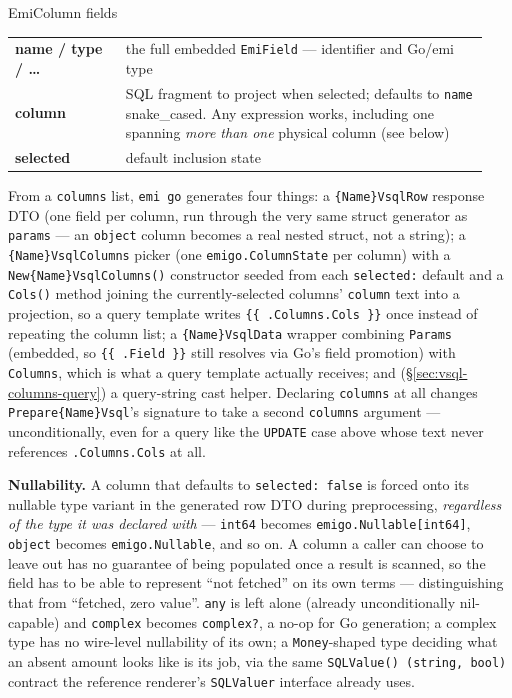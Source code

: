 \begin{sidebar}{EmiColumn fields}
\small
\begin{tabular}{@{}p{0.22\linewidth}p{0.72\linewidth}@{}}
\textbf{name / type / \dots} & the full embedded \texttt{EmiField} --- identifier and Go/emi type \\
\textbf{column} & SQL fragment to project when selected; defaults to \texttt{name} snake\_cased. Any expression works, including one spanning \emph{more than one} physical column (see below) \\
\textbf{selected} & default inclusion state \\
\end{tabular}
\end{sidebar}

From a \texttt{columns} list, \texttt{emi go} generates four things:
a \texttt{\{Name\}VsqlRow} response DTO (one field per column, run
through the very same struct generator as \texttt{params} --- an
\texttt{object} column becomes a real nested struct, not a string);
a \texttt{\{Name\}VsqlColumns} picker (one \texttt{emigo.ColumnState}
per column) with a \texttt{New\{Name\}VsqlColumns()} constructor
seeded from each \texttt{selected:} default and a \texttt{Cols()}
method joining the currently-selected columns' \texttt{column} text
into a projection, so a query template writes \texttt{\{\{
.Columns.Cols \}\}} once instead of repeating the column list; a
\texttt{\{Name\}VsqlData} wrapper combining \texttt{Params} (embedded,
so \texttt{\{\{ .Field \}\}} still resolves via Go's field promotion)
with \texttt{Columns}, which is what a query template actually
receives; and (\S\ref{sec:vsql-columns-query}) a query-string cast
helper. Declaring \texttt{columns} at all changes
\texttt{Prepare\{Name\}Vsql}'s signature to take a second
\texttt{columns} argument --- unconditionally, even for a query like
the \texttt{UPDATE} case above whose text never references
\texttt{.Columns.Cols} at all.

\textbf{Nullability.} A column that defaults to \texttt{selected:
false} is forced onto its nullable type variant in the generated row
DTO during preprocessing, \emph{regardless of the type it was
declared with} --- \texttt{int64} becomes \texttt{emigo.Nullable[int64]},
\texttt{object} becomes \texttt{emigo.Nullable\allowbreak[RowAddress]},
and so on. A column a caller can choose to leave out has no guarantee
of being populated once a result is scanned, so the field has to be
able to represent ``not fetched'' on its own terms --- distinguishing
that from ``fetched, zero value''. \texttt{any} is left alone (already
unconditionally nil-capable) and \texttt{complex} becomes
\texttt{complex?}, a no-op for Go generation; a complex type has no
wire-level nullability of its own; a \texttt{Money}-shaped type
deciding what an absent amount looks like is its job, via the same
\texttt{SQLValue() (string, bool)} contract the reference renderer's
\texttt{SQLValuer} interface already uses.

